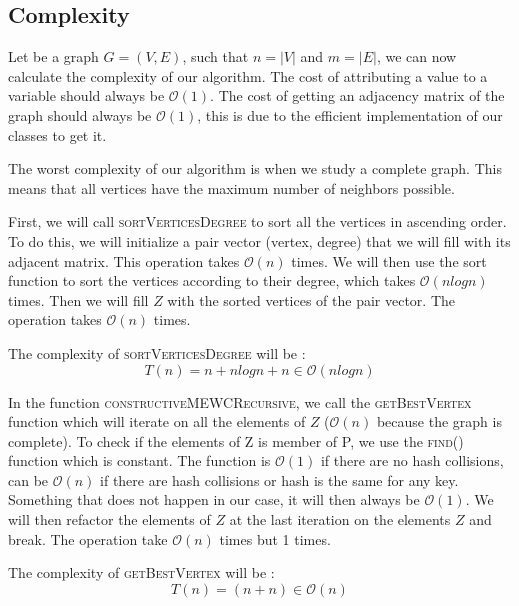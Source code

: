 
\subsection{Complexity}

Let be a graph $G = (V,E)$, such that $n =|V|$ and $m = |E|$, we can now calculate the complexity of our algorithm. The cost of attributing a value to a variable should always be $\mathcal{O}(1)$. The cost of getting an adjacency matrix of the graph should always be $\mathcal{O}(1)$, this is due to the efficient implementation of our classes to get it.
\bigskip

The worst complexity of our algorithm is when we study a complete graph. This means that all vertices have the maximum number of neighbors possible.
\bigskip

First, we will call \textsc{sortVerticesDegree} to sort all the vertices in ascending order. To do this, we will initialize a pair vector (vertex, degree) that we will fill with its adjacent matrix. This operation takes $\mathcal{O}(n)$ times. We will then use the sort function to sort the vertices according to their degree, which takes $\mathcal{O}(nlogn)$ times\footnotemark. Then we will fill $Z$ with the sorted vertices of the pair vector. The operation takes $\mathcal{O}(n)$ times.
\bigskip

The complexity of \textsc{sortVerticesDegree} will be :
\begin{equation}
    T(n) = n + nlogn + n \in \mathcal{O}(nlogn)
\end{equation}

In the function \textsc{constructiveMEWCRecursive}, we call the \textsc{getBestVertex} function which will iterate on all the elements of $Z$ ($\mathcal{O}(n)$ because the graph is complete). To check if the elements of Z is member of P, we use the \textsc{find()} function which is constant\footnotemark. The function is $\mathcal{O}(1)$ if there are no hash collisions, can be $\mathcal{O}(n)$ if there are hash collisions or hash is the same for any key. Something that does not happen in our case, it will then always be $\mathcal{O}(1)$. We will then refactor the elements of $Z$ at the last iteration on the elements $Z$ and break. The operation take $\mathcal{O}(n)$ times but 1 times.
\bigskip

The complexity of \textsc{getBestVertex} will be :
\begin{equation}
    T(n) = (n+n) \in \mathcal{O}(n)
\end{equation}

